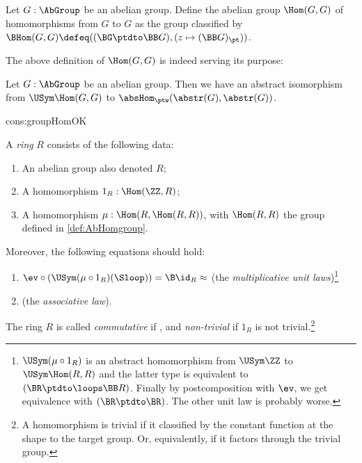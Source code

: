 \begin{definition}\label{def:AbHomgroup}
Let $G:\AbGroup$ be an abelian group. Define the abelian group $\Hom(G,G)$
of homomorphisms from $G$ to $G$ as the group classified
by $\BHom(G,G) \defeq ((\BG\ptdto\BB G),(z\mapsto (\BB G)_\pt))$.
\end{definition}

The above definition of $\Hom(G,G)$ is indeed serving its purpose:

\begin{construction}\label{cons:groupHomOK}
Let $G:\AbGroup$ be an abelian group. Then we have an abstract isomorphism
from $\USym\Hom(G,G)$ to $\absHom_{\ptw}(\abstr(G),\abstr(G))$.
\end{construction}
\begin{implementation}{cons:groupHomOK}
\end{implementation}

\begin{definition}\label{def:ring}
A \emph{ring} $R$ consists of the following data:
\begin{enumerate}
\item An abelian group also denoted $R$;
\item A homomorphism $1_R:\Hom(\ZZ,R)$;
\item A homomorphism $\mu: \Hom(R,\Hom(R,R))$, with $\Hom(R,R)$
the group defined in \cref{def:AbHomgroup}.
\end{enumerate}
Moreover, the following equations should hold:
    \begin{enumerate}
    \item $\ev\circ(\USym(\mu\circ{1_R})(\Sloop)) = \B\id_R \approx \MB{TBD}$ 
    (the \emph{multiplicative unit laws})\footnote{%
 $\USym(\mu\circ{1_R})$ is an abstract homomorphism
from $\USym\ZZ$ to $\USym\Hom(R,R)$ and the latter type
is equivalent to $(\BR\ptdto\loops\BB R)$. Finally by postcomposition
with $\ev$, we get equivalence with $(\BR\ptdto\BR)$.
The other unit law is probably worse.}
    \item {} (the \emph{associative law}). %
    \end{enumerate}
The ring $R$ is called \emph{commutative} if , 
and \emph{non-trivial} if $1_R$ is not trivial.\footnote{%
A homomorphism is trivial if it classified by the constant function
at the shape to the target group. Or, equivalently, if it factors
through the trivial group.}
\end{definition}

